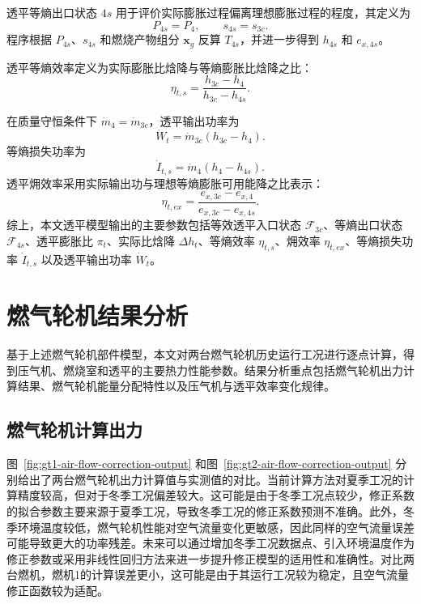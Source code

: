 透平等熵出口状态 $4s$ 用于评价实际膨胀过程偏离理想膨胀过程的程度，其定义为
\begin{equation}\label{eq:turbine-isentropic-state}
P_{4s}=P_4,
\qquad
s_{4s}=s_{3c}.
\end{equation}
程序根据 $P_{4s}$、$s_{4s}$ 和燃烧产物组分 $\boldsymbol{x}_g$ 反算 $T_{4s}$，并进一步得到 $h_{4s}$ 和 $e_{x,4s}$。

透平等熵效率定义为实际膨胀比焓降与等熵膨胀比焓降之比：
\begin{equation}\label{eq:turbine-isentropic-eff}
\eta_{t,s}
=
\frac{h_{3c}-h_4}{h_{3c}-h_{4s}}.
\end{equation}

在质量守恒条件下 $\dot{m}_4=\dot{m}_{3c}$，透平输出功率为
\begin{equation}\label{eq:turbine-power}
\dot{W}_t
=
\dot{m}_{3c}
\left(
h_{3c}-h_4
\right).
\end{equation}
等熵损失功率为
\begin{equation}\label{eq:turbine-isentropic-loss}
\dot{I}_{t,s}
=
\dot{m}_4
\left(
h_4-h_{4s}
\right).
\end{equation}
透平㶲效率采用实际输出功与理想等熵膨胀可用能降之比表示：
\begin{equation}\label{eq:turbine-exergy-eff}
\eta_{t,ex}
=
\frac{e_{x,3c}-e_{x,4}}{e_{x,3c}-e_{x,4s}}.
\end{equation}
综上，本文透平模型输出的主要参数包括等效透平入口状态 $\mathcal{F}_{3c}$、等熵出口状态 $\mathcal{F}_{4s}$、透平膨胀比 $\pi_t$、实际比焓降 $\Delta h_t$、等熵效率 $\eta_{t,s}$、㶲效率 $\eta_{t,ex}$、等熵损失功率 $\dot{I}_{t,s}$ 以及透平输出功率 $\dot{W}_t$。

\section{燃气轮机结果分析}

基于上述燃气轮机部件模型，本文对两台燃气轮机历史运行工况进行逐点计算，得到压气机、燃烧室和透平的主要热力性能参数。结果分析重点包括燃气轮机出力计算结果、燃气轮机能量分配特性以及压气机与透平效率变化规律。

\subsection{燃气轮机计算出力}

图~\ref{fig:gt1-air-flow-correction-output} 和图~\ref{fig:gt2-air-flow-correction-output} 分别给出了两台燃气轮机出力计算值与实测值的对比。当前计算方法对夏季工况的计算精度较高，但对于冬季工况偏差较大。这可能是由于冬季工况点较少，修正系数的拟合参数主要来源于夏季工况，导致冬季工况的修正系数预测不准确。此外，冬季环境温度较低，燃气轮机性能对空气流量变化更敏感，因此同样的空气流量误差可能导致更大的功率残差。未来可以通过增加冬季工况数据点、引入环境温度作为修正参数或采用非线性回归方法来进一步提升修正模型的适用性和准确性。对比两台燃机，燃机1的计算误差更小，这可能是由于其运行工况较为稳定，且空气流量修正函数较为适配。

